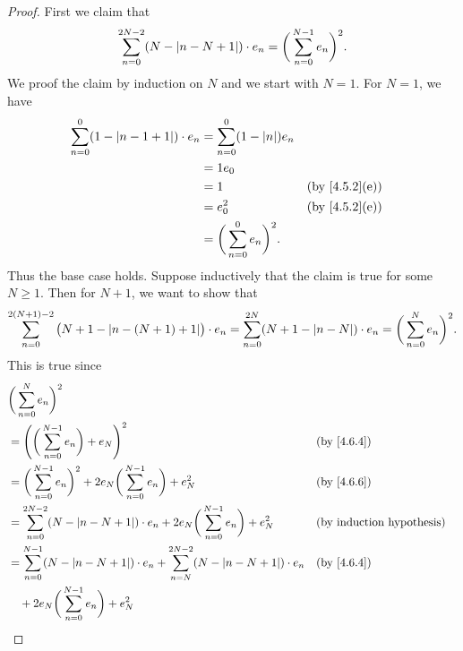 \begin{proof}
  First we claim that
  \[
    \sum_{n = 0}^{2N - 2} (N - \left\lvert n - N + 1\right\rvert) \cdot e_n = \bigg(\sum_{n = 0}^{N - 1} e_n\bigg)^2.
  \]
  We proof the claim by induction on \(N\) and we start with \(N = 1\).
  For \(N = 1\), we have
  \begin{align*}
    \sum_{n = 0}^0 (1 - \abs{n - 1 + 1}) \cdot e_n & = \sum_{n = 0}^0 (1 - \abs{n}) e_n                                   \\
                                                   & = 1 e_0                                                              \\
                                                   & = 1                                 &  & \text{(by \cref{4.5.2}(e))} \\
                                                   & = e_0^2                             &  & \text{(by \cref{4.5.2}(e))} \\
                                                   & = \bigg(\sum_{n = 0}^0 e_n\bigg)^2.
  \end{align*}
  Thus the base case holds.
  Suppose inductively that the claim is true for some \(N \geq 1\).
  Then for \(N + 1\), we want to show that
  \[
    \sum_{n = 0}^{2(N + 1) - 2} \big(N + 1 - \abs{n - (N + 1) + 1}\big) \cdot e_n = \sum_{n = 0}^{2N} (N + 1 - \abs{n - N}) \cdot e_n = \bigg(\sum_{n = 0}^N e_n\bigg)^2.
  \]
  This is true since
  \begin{align*}
     & \bigg(\sum_{n = 0}^N e_n\bigg)^2                                                                                                               \\
     & = \Bigg(\bigg(\sum_{n = 0}^{N - 1} e_n\bigg) + e_N\Bigg)^2                                                                     &  & \by{4.6.4} \\
     & = \bigg(\sum_{n = 0}^{N - 1} e_n\bigg)^2 + 2 e_N \bigg(\sum_{n = 0}^{N - 1} e_n\bigg) + e_N^2                                  &  & \by{4.6.6} \\
     & = \sum_{n = 0}^{2N - 2} (N - \abs{n - N + 1}) \cdot e_n + 2 e_N \bigg(\sum_{n = 0}^{N - 1} e_n\bigg) + e_N^2                   &  & \byIH      \\
     & = \sum_{n = 0}^{N - 1} (N - \abs{n - N + 1}) \cdot e_n + \sum_{n = N}^{2N - 2} (N - \abs{n - N + 1}) \cdot e_n                 &  & \by{4.6.4} \\
     & \quad + 2 e_N \bigg(\sum_{n = 0}^{N - 1} e_n\bigg) + e_N^2                                                                                     \\

\end{align*}
\end{proof}
